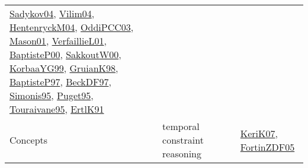 {\begin{longtable}{lp{3cm}>{\raggedright}p{6cm}>{\raggedright}p{6cm}p{8cm}}
\href{papers/Sadykov04.pdf}{Sadykov04}\cite{Sadykov04}, \href{papers/Vilim04.pdf}{Vilim04}\cite{Vilim04}, \href{papers/HentenryckM04.pdf}{HentenryckM04}\cite{HentenryckM04}, \href{papers/OddiPCC03.pdf}{OddiPCC03}\cite{OddiPCC03}, \href{articles/Mason01.pdf}{Mason01}\cite{Mason01}, \href{papers/VerfaillieL01.pdf}{VerfaillieL01}\cite{VerfaillieL01}, \href{articles/BaptisteP00.pdf}{BaptisteP00}\cite{BaptisteP00}, \href{articles/SakkoutW00.pdf}{SakkoutW00}\cite{SakkoutW00}, \href{papers/KorbaaYG99.pdf}{KorbaaYG99}\cite{KorbaaYG99}, \href{papers/GruianK98.pdf}{GruianK98}\cite{GruianK98}, \href{papers/BaptisteP97.pdf}{BaptisteP97}\cite{BaptisteP97}, \href{papers/BeckDF97.pdf}{BeckDF97}\cite{BeckDF97}, \href{papers/Simonis95.pdf}{Simonis95}\cite{Simonis95}, \href{papers/Puget95.pdf}{Puget95}\cite{Puget95}, \href{papers/Touraivane95.pdf}{Touraivane95}\cite{Touraivane95}, \href{papers/ErtlK91.pdf}{ErtlK91}\cite{ErtlK91}\\
Concepts & temporal constraint reasoning &  &  & \href{papers/KeriK07.pdf}{KeriK07}\cite{KeriK07}, \href{papers/FortinZDF05.pdf}{FortinZDF05}\cite{FortinZDF05}\\

\end{longtable}}
